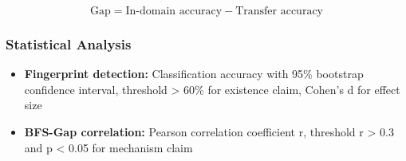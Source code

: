 $$\text{Gap} = \text{In-domain accuracy} - \text{Transfer accuracy}$$

\subsubsection{Statistical Analysis}

\begin{itemize}
\item \textbf{Fingerprint detection:} Classification accuracy with 95\% bootstrap confidence interval, threshold > 60\% for existence claim, Cohen's d for effect size
\item \textbf{BFS-Gap correlation:} Pearson correlation coefficient r, threshold r > 0.3 and p < 0.05 for mechanism claim
\end{itemize}

